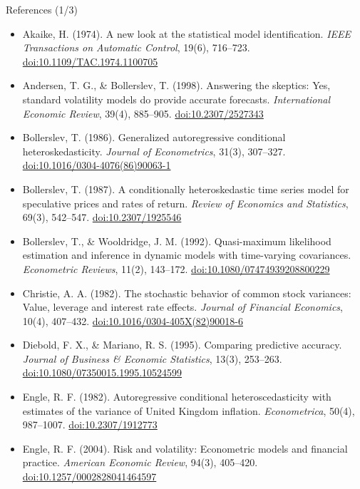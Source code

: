 \begin{frame}{References (1/3)}
\itemsize{\scriptsize}
\begin{itemize}
    \item Akaike, H. (1974). A new look at the statistical model identification. \textit{IEEE Transactions on Automatic Control}, 19(6), 716--723. \href{https://doi.org/10.1109/TAC.1974.1100705}{doi:10.1109/TAC.1974.1100705}
    \item Andersen, T. G., \& Bollerslev, T. (1998). Answering the skeptics: Yes, standard volatility models do provide accurate forecasts. \textit{International Economic Review}, 39(4), 885--905. \href{https://doi.org/10.2307/2527343}{doi:10.2307/2527343}
    \item Bollerslev, T. (1986). Generalized autoregressive conditional heteroskedasticity. \textit{Journal of Econometrics}, 31(3), 307--327. \href{https://doi.org/10.1016/0304-4076(86)90063-1}{doi:10.1016/0304-4076(86)90063-1}
    \item Bollerslev, T. (1987). A conditionally heteroskedastic time series model for speculative prices and rates of return. \textit{Review of Economics and Statistics}, 69(3), 542--547. \href{https://doi.org/10.2307/1925546}{doi:10.2307/1925546}
    \item Bollerslev, T., \& Wooldridge, J. M. (1992). Quasi-maximum likelihood estimation and inference in dynamic models with time-varying covariances. \textit{Econometric Reviews}, 11(2), 143--172. \href{https://doi.org/10.1080/07474939208800229}{doi:10.1080/07474939208800229}
    \item Christie, A. A. (1982). The stochastic behavior of common stock variances: Value, leverage and interest rate effects. \textit{Journal of Financial Economics}, 10(4), 407--432. \href{https://doi.org/10.1016/0304-405X(82)90018-6}{doi:10.1016/0304-405X(82)90018-6}
    \item Diebold, F. X., \& Mariano, R. S. (1995). Comparing predictive accuracy. \textit{Journal of Business \& Economic Statistics}, 13(3), 253--263. \href{https://doi.org/10.1080/07350015.1995.10524599}{doi:10.1080/07350015.1995.10524599}
    \item Engle, R. F. (1982). Autoregressive conditional heteroscedasticity with estimates of the variance of United Kingdom inflation. \textit{Econometrica}, 50(4), 987--1007. \href{https://doi.org/10.2307/1912773}{doi:10.2307/1912773}
    \item Engle, R. F. (2004). Risk and volatility: Econometric models and financial practice. \textit{American Economic Review}, 94(3), 405--420. \href{https://doi.org/10.1257/0002828041464597}{doi:10.1257/0002828041464597}
\end{itemize}
\end{frame}

